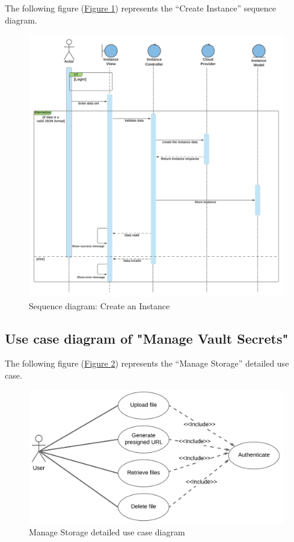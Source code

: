 The following figure (\hyperref[fig:seq-instance]{Figure \ref{fig:seq-instance}})  represents the ``Create Instance'' sequence diagram.
\begin{figure}[h]
  \center
  \includegraphics[width=14cm]{./chapters/sprint2/seq-instance.png}
  \caption{Sequence diagram: Create an Instance}
  \label{fig:seq-instance}
\end{figure}

\subsection{Use case diagram of "Manage Vault Secrets"}

The following figure (\hyperref[fig:use_case-manage_bucket2]{Figure \ref{fig:use_case-manage_bucket2}})  represents the ``Manage Storage'' detailed use case.
\begin{figure}[h]
  \center
  \includegraphics[width=14cm]{./chapters/sprint2/use_case-manage_bucket2.png}
  \caption{Manage Storage detailed use case diagram}
  \label{fig:use_case-manage_bucket2}
\end{figure}

